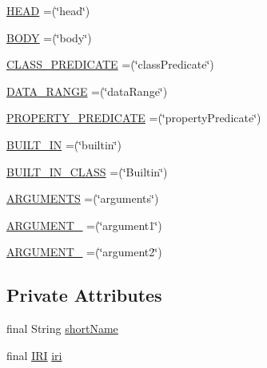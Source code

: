 \begin{DoxyCompactItemize}
\item 
\hyperlink{enumorg_1_1semanticweb_1_1owlapi_1_1vocab_1_1_s_w_r_l_vocabulary_a0007f8338f007bb671274ab010fb11b3}{H\-E\-A\-D} =(\char`\"{}head\char`\"{})
\item 
\hyperlink{enumorg_1_1semanticweb_1_1owlapi_1_1vocab_1_1_s_w_r_l_vocabulary_a6f558d4840154e8d005735e450436afe}{B\-O\-D\-Y} =(\char`\"{}body\char`\"{})
\item 
\hyperlink{enumorg_1_1semanticweb_1_1owlapi_1_1vocab_1_1_s_w_r_l_vocabulary_a42cc3c78ece97c93ef135d1f3d5a87a3}{C\-L\-A\-S\-S\-\_\-\-P\-R\-E\-D\-I\-C\-A\-T\-E} =(\char`\"{}class\-Predicate\char`\"{})
\item 
\hyperlink{enumorg_1_1semanticweb_1_1owlapi_1_1vocab_1_1_s_w_r_l_vocabulary_a8d75b471984f1fe113fcf7725defaef3}{D\-A\-T\-A\-\_\-\-R\-A\-N\-G\-E} =(\char`\"{}data\-Range\char`\"{})
\item 
\hyperlink{enumorg_1_1semanticweb_1_1owlapi_1_1vocab_1_1_s_w_r_l_vocabulary_abcaf43f5fe68c11d9a9f8aa965991f97}{P\-R\-O\-P\-E\-R\-T\-Y\-\_\-\-P\-R\-E\-D\-I\-C\-A\-T\-E} =(\char`\"{}property\-Predicate\char`\"{})
\item 
\hyperlink{enumorg_1_1semanticweb_1_1owlapi_1_1vocab_1_1_s_w_r_l_vocabulary_a3333593a5b776ed67836ddeb4acb8682}{B\-U\-I\-L\-T\-\_\-\-I\-N} =(\char`\"{}builtin\char`\"{})
\item 
\hyperlink{enumorg_1_1semanticweb_1_1owlapi_1_1vocab_1_1_s_w_r_l_vocabulary_a457cad82161e6c8a41c0273b21af25b1}{B\-U\-I\-L\-T\-\_\-\-I\-N\-\_\-\-C\-L\-A\-S\-S} =(\char`\"{}Builtin\char`\"{})
\item 
\hyperlink{enumorg_1_1semanticweb_1_1owlapi_1_1vocab_1_1_s_w_r_l_vocabulary_a9aab162acd2c31078de6bb9403427ac1}{A\-R\-G\-U\-M\-E\-N\-T\-S} =(\char`\"{}arguments\char`\"{})
\item 
\hyperlink{enumorg_1_1semanticweb_1_1owlapi_1_1vocab_1_1_s_w_r_l_vocabulary_a263e9c60b1b1ab8b19b9ff96a05c1e5a}{A\-R\-G\-U\-M\-E\-N\-T\-\_} =(\char`\"{}argument1\char`\"{})
\item 
\hyperlink{enumorg_1_1semanticweb_1_1owlapi_1_1vocab_1_1_s_w_r_l_vocabulary_a012a0d2d91da6362bd7e148c0ee589c6}{A\-R\-G\-U\-M\-E\-N\-T\-\_} =(\char`\"{}argument2\char`\"{})
\end{DoxyCompactItemize}
\subsection*{Private Attributes}
\begin{DoxyCompactItemize}
\item 
final String \hyperlink{enumorg_1_1semanticweb_1_1owlapi_1_1vocab_1_1_s_w_r_l_vocabulary_a68ae204ba644bdd1793e721a829c9dc5}{short\-Name}
\item 
final \hyperlink{classorg_1_1semanticweb_1_1owlapi_1_1model_1_1_i_r_i}{I\-R\-I} \hyperlink{enumorg_1_1semanticweb_1_1owlapi_1_1vocab_1_1_s_w_r_l_vocabulary_a53adcc68ebd6d175769fb988276a7ec7}{iri}
\end{DoxyCompactItemize}



